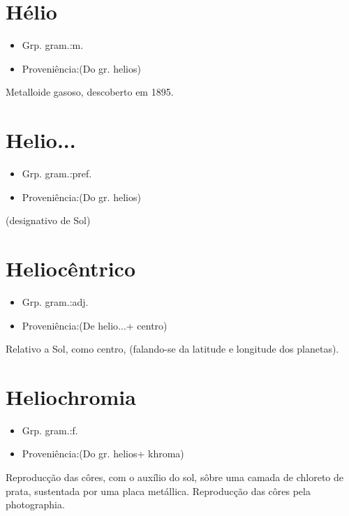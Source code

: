 \documentclass{article}
\begin{document}
\section{Hélio}
\begin{itemize}
\item {Grp. gram.:m.}
\end{itemize}
\begin{itemize}
\item {Proveniência:(Do gr. \textunderscore helios\textunderscore )}
\end{itemize}
Metalloide gasoso, descoberto em 1895.
\section{Helio...}
\begin{itemize}
\item {Grp. gram.:pref.}
\end{itemize}
\begin{itemize}
\item {Proveniência:(Do gr. \textunderscore helios\textunderscore )}
\end{itemize}
(designativo de \textunderscore Sol\textunderscore )
\section{Heliocêntrico}
\begin{itemize}
\item {Grp. gram.:adj.}
\end{itemize}
\begin{itemize}
\item {Proveniência:(De \textunderscore helio...\textunderscore  + \textunderscore centro\textunderscore )}
\end{itemize}
Relativo a Sol, como centro, (falando-se da latitude e longitude dos planetas).
\section{Heliochromia}
\begin{itemize}
\item {Grp. gram.:f.}
\end{itemize}
\begin{itemize}
\item {Proveniência:(Do gr. \textunderscore helios\textunderscore  + \textunderscore khroma\textunderscore )}
\end{itemize}
Reproducção das côres, com o auxílio do sol, sôbre uma camada de chloreto de prata, sustentada por uma placa metállica.
Reproducção das côres pela photographia.
\end{document}
